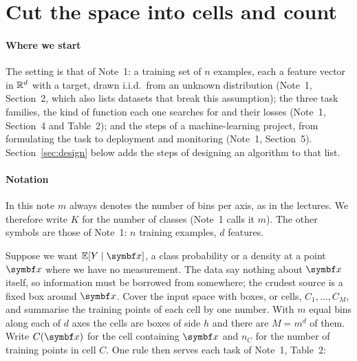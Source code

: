 \documentclass[11pt]{article}
\begin{document}

\section{Cut the space into cells and count}\label{sec:hist}

\paragraph{Where we start} The setting is that of Note~1: a training set of $n$ examples, each a feature vector in
$\mathbb{R}^d$ with a target, drawn i.i.d.\ from an unknown distribution (Note~1, Section~2, which also lists datasets that
break this assumption); the three task families, the kind of function each one searches for and their losses
(Note~1, Section~4 and Table~2); and the steps of a machine-learning project, from formulating the task to
deployment and monitoring (Note~1, Section~5). Section~\ref{sec:design} below adds the steps of designing an algorithm to that list.

\paragraph{Notation} In this note $m$ always denotes the number of bins per axis, as in the lectures. We therefore
write $K$ for the number of classes (Note~1 calls it $m$). The other symbols are those of Note~1: $n$ training
examples, $d$ features.

Suppose we want $\E[Y \mid \x]$, a class probability or a density at a point $\x$ where we have no measurement. The
data say nothing about $\x$ itself, so information must be borrowed from somewhere; the crudest source is a fixed
box around $\x$. Cover the input space with boxes, or cells, $C_1, \dots, C_M$, and summarise the training points
of each cell by one number. With $m$ equal bins along each of $d$ axes the cells are boxes of side $h$ and there
are $M = m^d$ of them. Write $C(\x)$ for the cell containing $\x$ and $n_C$ for the number of training points in
cell $C$. One rule then serves each task of Note~1, Table~2:
\end{document}
